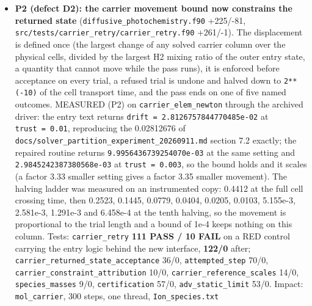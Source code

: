 \documentclass[english,a4paper]{my_memo}
\begin{document}
\begin{itemize}
  \texttt{Hydro\_ioniz.txt} identical but the provenance \texttt{run=} timestamp, on both
  cases; the marching caller passes no status, so none of the new tests
  runs there. One fixture of the same suite was corrected while there
  (\texttt{the\_relaxation\_fixed\_point\_under\_a\_callers\_ghost} built a column whose
  species missed rho by \texttt{1.321E-01}): on the suite\textquotesingle s own mass-closed column
  the worst interior element row of the relaxation fixed point moves from
  \texttt{1.62384E-02} to \texttt{1.35062E-13}, so the fixed point on a mass-closed column
  really is a zero of the stationary element row.
\item
  \textbf{P2 (defect D2): the carrier movement bound now constrains the returned
  state} (\texttt{diffusive\_photochemistry.f90} +225/-81,
  \texttt{src/tests/carrier\_retry/carrier\_retry.f90} +261/-1). The displacement is defined once (the largest change of any solved
  carrier column over the physical cells, divided by the largest H2 mixing
  ratio of the outer entry state, a quantity that cannot move while the pass
  runs), it is enforced before acceptance on every trial, a refused trial is
  undone and halved down to \texttt{2**(-10)} of the cell transport time, and the
  pass ends on one of five named outcomes. MEASURED (P2) on
  \texttt{carrier\_elem\_newton} through the archived driver: the entry text returns
  \texttt{drift\ =\ 2.8126757844770485e-02} at \texttt{trust\ =\ 0.01}, reproducing the
  0.02812676 of \texttt{docs/solver\_partition\_experiment\_20260911.md} section 7.2
  exactly; the repaired routine returns \texttt{9.9956436739254070e-03} at the same
  setting and \texttt{2.9845242387380568e-03} at \texttt{trust\ =\ 0.003}, so the bound holds
  and it scales (a factor 3.33 smaller setting gives a factor 3.35 smaller
  movement). The halving ladder was measured on an instrumented copy: 0.4412
  at the full cell crossing time, then 0.2523, 0.1445, 0.0779, 0.0404,
  0.0205, 0.0103, 5.155e-3, 2.581e-3, 1.291e-3 and 6.458e-4 at the tenth
  halving, so the movement is proportional to the trial length and a bound of
  1e-4 keeps nothing on this column. Tests: \texttt{carrier\_retry} \textbf{111 PASS / 10
  FAIL} on a RED control carrying the entry logic behind the new interface,
  \textbf{122/0} after; \texttt{carrier\_returned\_state\_acceptance} 36/0, \texttt{attempted\_step}
  70/0, \texttt{carrier\_constraint\_attribution} 10/0, \texttt{carrier\_reference\_scales}
  14/0, \texttt{species\_masses} 9/0, \texttt{certification} 57/0, \texttt{adv\_static\_limit} 53/0.
  Impact: \texttt{mol\_carrier}, 300 steps, one thread, \texttt{Ion\_species.txt}

\end{itemize}
\end{document}
